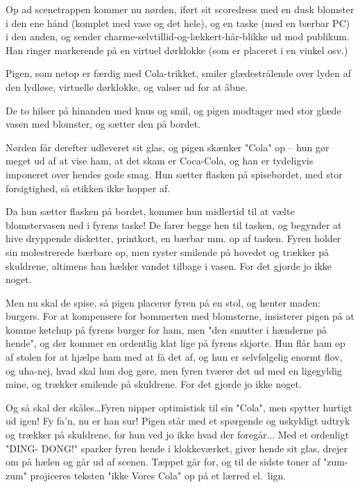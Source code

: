 \documentclass[11pt]{article}
\begin{document}
\begin{sketch}
{Op ad scenetrappen kommer nu nørden, iført sit scoredress med en dusk
blomster i den ene hånd (komplet med vase og det hele), og en taske (med en
bærbar PC) i den anden, og sender charme-selvtillid-og-lækkert-hår-blikke
ud mod publikum. Han ringer markerende på en virtuel dørklokke (som er
placeret i en vinkel osv.)

Pigen, som netop er færdig med Cola-trikket, smiler glædestrålende over
lyden af den lydløse, virtuelle dørklokke, og valser ud for at åbne.

De to hilser på hinanden med knus og smil, og pigen modtager med stor glæde
vasen med blomster, og sætter den på bordet.

Nørden får derefter udleveret sit glas, og pigen skænker "Cola" op -- hun
gør meget ud af at vise ham, at det skam er Coca-Cola, og han er tydeligvis
imponeret over hendes gode smag. Hun sætter flasken på spisebordet, med
stor forsigtighed, så etikken ikke hopper af.

Da hun sætter flasken på bordet, kommer hun midlertid til at vælte
blomstervasen ned i fyrens taske! De farer begge hen til tasken, og
begynder at hive dryppende disketter, printkort, en bærbar mm. op af
tasken. Fyren holder sin molestrerede bærbare op, men ryster smilende på
hovedet og trækker på skuldrene, altimens han hælder vandet tilbage i
vasen. For det gjorde jo ikke noget.

Men nu skal de spise, så pigen placerer fyren på en stol, og henter maden:
burgers.  For at kompensere for bommerten med blomsterne, insisterer pigen
på at komme ketchup på fyrens burger for ham, men "den smutter i hænderne
på hende", og der kommer en ordentlig klat lige på fyrens skjorte. Hun flår
ham op af stolen for at hjælpe ham med at få det af, og hun er selvfølgelig
enormt flov, og uha-nej, hvad skal hun dog gøre, men fyren tværer det ud
med en ligegyldig mine, og trækker smilende på skuldrene. For det gjorde jo
ikke noget.

Og så skal der skåles\ldots Fyren nipper optimistisk til sin "Cola", men
spytter hurtigt ud igen! Fy fa'n, nu er han sur! Pigen står med et
spørgende og uskyldigt udtryk og trækker på skuldrene, for hun ved jo ikke
hvad der foregår... Med et ordenligt "DING- DONG!" sparker fyren hende i
klokkeværket, giver hende sit glas, drejer om på hælen og går ud af scenen.
Tæppet går for, og til de sidste toner af "zum-zum" projiceres teksten
"ikke Vores Cola" op på et lærred el.\ lign.}


\end{sketch}
\end{document}
